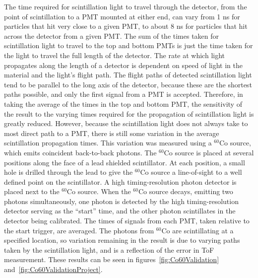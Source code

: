 The time required for scintillation light to travel through the detector, from the point of scintillation to a PMT mounted at either end, can vary from 1 ns for particles that hit very close to a given PMT, to about 8 ns for particles that hit across the detector from a given PMT.
The sum of the times taken for scintillation light to travel to the top and bottom PMTs is just the time taken for the light to travel the full length of the detector.
The rate at which light propagates along the length of a detector is dependent on speed of light in the material and the light's flight path.
The flight paths of detected scintillation light tend to be parallel to the long axis of the detector, because these are the shortest paths possible, and only the first signal from a PMT is accepted.
Therefore, in taking the average of the times in the top and bottom PMT, the sensitivity of the result to the varying times required for the propagation of scintillation light is greatly reduced.
However, because the scintillation light does not always take to most direct path to a PMT, there is still some variation in the average scintillation propagation times.
This variation was measured using a $^{60}$Co source, which emits coincident back-to-back photons.
The $^{60}$Co source is placed at several positions along the face of a lead shielded scintillator.
At each position, a small hole is drilled through the lead to give the $^{60}$Co source a line-of-sight to a well defined point on the scintillator.
A high timing-resolution photon detector is placed next to the $^{60}$Co source.
When the $^{60}$Co source decays, emitting two photons simultaneously, one photon is detected by the high timing-resolution detector serving as the ``start'' time, and the other photon scintillates in the detector being calibrated.
The times of signals from each PMT, taken relative to the start trigger, are averaged.
The photons from $^{60}$Co are scintillating at a specified location, so variation remaining in the result is due to varying paths taken by the scintillation light, and is a reflection of the error in ToF measurement.
These results can be seen in figures~\ref{fig:Co60Validation} and~\ref{fig:Co60ValidationProject}.
